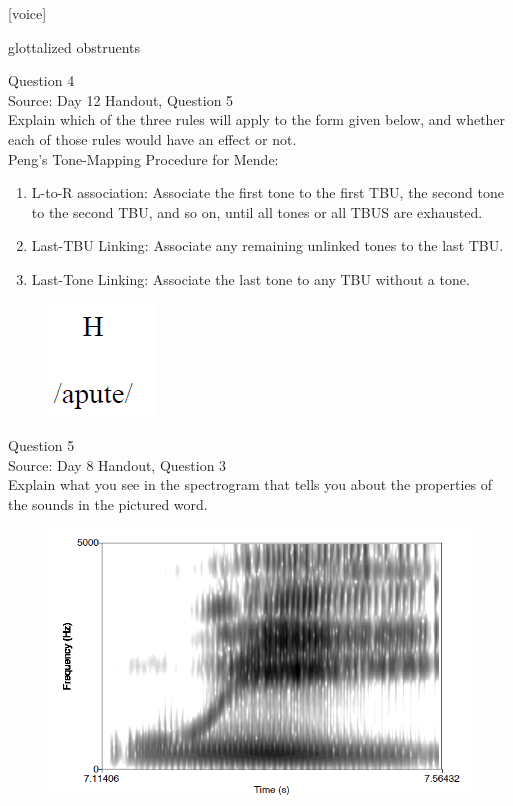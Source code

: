 \documentclass[12pt]{article}
\begin{document}
{[voice]}

glottalized obstruents


\newpage

{\large Question 4}\\

Source: Day 12 Handout, Question 5\\

Explain which of the three rules will apply to the form given below, and whether each of those rules would have an effect or not.\\

Peng’s Tone-Mapping Procedure for Mende: \begin{enumerate} \item L-to-R association: Associate the first tone to the first TBU, the second tone to the second TBU, and so on, until all tones or all TBUS are exhausted. \item Last-TBU Linking: Associate any remaining unlinked tones to the last TBU. \item Last-Tone Linking: Associate the last tone to any TBU without a tone. \end{enumerate}

\begin{figure}[H]
\includegraphics{../images/mendetone_b.png}
\end{figure}

\newpage

{\large Question 5}\\

Source: Day 8 Handout, Question 3\\

Explain what you see in the spectrogram that tells you about the properties of the sounds in the pictured word.\\

\begin{figure}[H]
\includegraphics{../images/spectrogram_we.png}
\end{figure}
\end{document}

